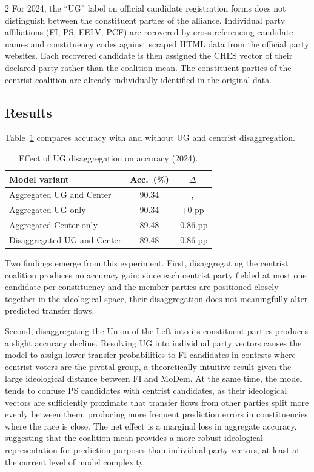 \documentclass[10pt, a4paper]{article}
\begin{document}
\begin{multicols}{2}
For 2024, the ``UG'' label on official candidate registration forms does not
distinguish between the constituent parties of the alliance. Individual party
affiliations (FI, PS, EELV, PCF) are recovered by cross-referencing candidate
names and constituency codes against scraped HTML data from the official party
websites. Each recovered candidate is then assigned the CHES vector of their
declared party rather than the coalition mean. The constituent parties of the
centrist coalition are already individually identified in the original data.

\subsection{Results}

Table~\ref{tab:ug_split} compares accuracy with and without UG and centrist
disaggregation.

\begin{table}[H]
\centering
\caption{Effect of UG disaggregation on accuracy (2024).}
\label{tab:ug_split}
\small
\begin{tabular}{lcc}
\toprule
\textbf{Model variant} & \textbf{Acc.\ (\%)} & \textbf{$\Delta$} \\
\midrule
Aggregated UG and Center  & 90.34 & , \\
Aggregated UG only & 90.34 & +0 pp \\
Aggregated Center only & 89.48 & -0.86 pp \\
Disaggregated UG and Center & 89.48 & -0.86 pp \\

\bottomrule
\end{tabular}
\end{table}

\noindent
Two findings emerge from this experiment. First, disaggregating the centrist
coalition produces no accuracy gain: since each centrist party fielded at most
one candidate per constituency and the member parties are positioned closely
together in the ideological space, their disaggregation does not meaningfully
alter predicted transfer flows.

Second, disaggregating the Union of the Left into its constituent parties
produces a slight accuracy decline. Resolving UG into individual party vectors
causes the model to assign lower transfer probabilities to FI candidates in
contests where centrist voters are the pivotal group, a theoretically
intuitive result given the large ideological distance between FI and MoDem.
At the same time, the model tends to confuse PS candidates with centrist
candidates, as their ideological vectors are sufficiently proximate that
transfer flows from other parties split more evenly between them, producing
more frequent prediction errors in constituencies where the race is close.
The net effect is a marginal loss in aggregate accuracy, suggesting that the
coalition mean provides a more robust ideological representation for prediction
purposes than individual party vectors, at least at the current level of
model complexity.


\end{multicols}
\end{document}
